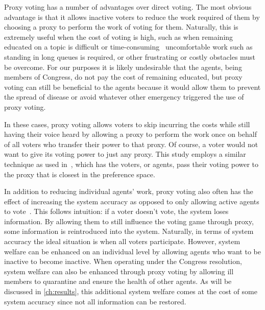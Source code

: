 Proxy voting has a number of advantages over direct voting.
The most obvious advantage is that it allows inactive voters to reduce the work
required of them by choosing a proxy to perform the work of voting for them.
Naturally, this is extremely useful when the cost of voting is high, such as
when remaining educated on a topic is difficult or
time-consuming~\cite{Mueller1972} uncomfortable work such as standing in
long queues is required, or other frustrating or costly obstacles must be overcome.
For our purposes it is likely undesirable that the agents, being members of Congress,
do not pay the cost of remaining educated, but proxy voting can still be beneficial
to the agents because it would allow them to prevent the spread of disease or avoid
whatever other emergency triggered the use of proxy voting.

In these cases, proxy voting allows voters to skip incurring the costs while
still having their voice heard by allowing a proxy to perform the work once on
behalf of all voters who transfer their power to that proxy.
Of course, a voter would not want to give its voting power to just any proxy.
This study employs a similar technique as used in~\cite{Cohensius2017}, which has the
voters, or agents, pass their voting power to the proxy that is closest in the
preference space.

In addition to reducing individual agents' work, proxy voting also often has
the effect of increasing the system accuracy as opposed to only allowing active
agents to vote~\cite{Cohensius2017}.
This follows intuition: if a voter doesn't vote, the system loses information.
By allowing them to still influence the voting game through proxy, some information
is reintroduced into the system.
Naturally, in terms of system accuracy the ideal situation is when all voters
participate.
However, system welfare can be enhanced on an individual level by allowing agents
who want to be inactive to become inactive.
When operating under the Congress resolution, system welfare can also be enhanced
through proxy voting by allowing ill members to quarantine and ensure the health
of other agents.
As will be discussed in \autoref{ch:results}, this additional system welfare comes at
the cost of some system accuracy since not all information can be restored.

